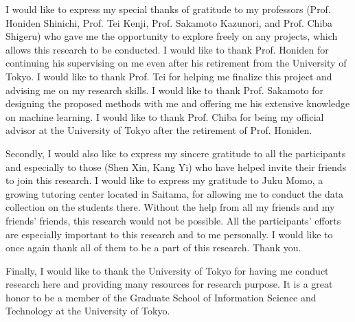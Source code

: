 I would like to express my special thanks of gratitude to my professors (Prof. Honiden Shinichi, Prof. Tei Kenji, Prof. Sakamoto Kazunori, and Prof. Chiba Shigeru) who gave me the opportunity to explore freely on any projects, which allows this research to be conducted. I would like to thank Prof. Honiden for continuing his supervising on me even after his retirement from the University of Tokyo. I would like to thank Prof. Tei for helping me finalize this project and advising me on my research skills. I would like to thank Prof. Sakamoto for designing the proposed methods with me and offering me his extensive knowledge on machine learning. I would like to thank Prof. Chiba for being my official advisor at the University of Tokyo after the retirement of Prof. Honiden.

Secondly, I would also like to express my sincere gratitude to all the participants and especially to those (Shen Xin, Kang Yi) who have helped invite their friends to join this research. I would like to express my gratitude to Juku Momo, a growing tutoring center located in Saitama, for allowing me to conduct the data collection on the students there. Without the help from all my friends and my friends' friends, this research would not be possible. All the participants' efforts are especially important to this research and to me personally. I would like to once again thank all of them to be a part of this research. Thank you.

Finally, I would like to thank the University of Tokyo for having me conduct research here and providing many resources for research purpose. It is a great honor to be a member of the Graduate School of Information Science and Technology at the University of Tokyo. 

